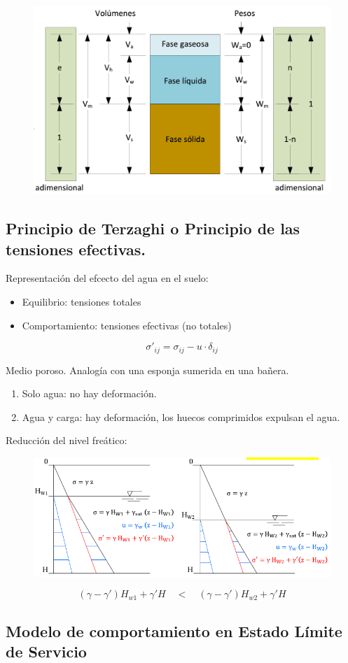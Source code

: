 \begin{figure}[H]
    \centering
    \includegraphics[width = 0.5 \textwidth]{Imagenes/Suelos Propiedades elementales.png}
\end{figure}

\subsection{Principio de Terzaghi o Principio de las tensiones efectivas.}
Representación del efcecto del agua en el suelo:
\begin{itemize}
    \item Equilibrio: tensiones totales
    \item Comportamiento: tensiones efectivas (no totales)
\end{itemize}
\[\sigma'_{ij} = \sigma_{ij} - u \cdot \delta_{ij}\]

Medio poroso. Analogía con una esponja sumerida en una bañera.
\begin{enumerate}
    \item Solo agua: no hay deformación.
    \item Agua y carga: hay deformación, los huecos comprimidos expulsan el agua.
\end{enumerate}

Reducción del nivel freático:

\begin{figure}[H]
    \centering
    \includegraphics[width = 0.5 \textwidth]{Imagenes/Suelos Reduccion del nive freatico.png}
\end{figure}

\[(\gamma - \gamma') H_{w1} + \gamma' H \quad < \quad (\gamma - \gamma') H_{w2} + \gamma' H\]

\subsection{Modelo de comportamiento en Estado Límite de Servicio}
